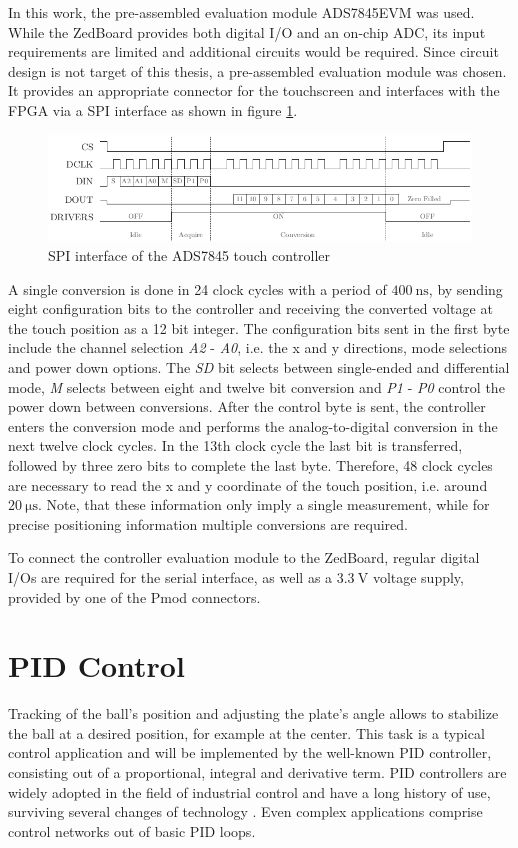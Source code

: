 In this work, the pre-assembled evaluation module ADS7845EVM \citep{ADS06} was
used. While the ZedBoard provides both digital I/O and an on-chip \ac{ADC},
its input requirements are limited and additional circuits would be required.
Since circuit design is not target of this thesis, a pre-assembled evaluation
module was chosen. It provides an appropriate connector for the touchscreen
and interfaces with the \ac{FPGA} via a \ac{SPI} interface as shown in figure
\ref{fig:touch_spi}.
\begin{figure}
	\centering
	\includegraphics{../figures/touch_spi}
	\caption{\acs{SPI} interface of the ADS7845 touch controller \citep[adapted from][]{ADST06}}
	\label{fig:touch_spi}
\end{figure}
A single conversion is done in 24 clock cycles with a period of
$\SI{400}{\nano\second}$, by sending eight configuration bits to the
controller and receiving the converted voltage at the touch position as a 12
bit integer. The configuration bits sent in the first byte include the channel
selection \emph{A2} - \emph{A0}, i.e. the x and y directions, mode selections
and power down options. The \emph{SD} bit selects between single-ended and
differential mode, \emph{M} selects between eight and twelve bit conversion
and \emph{P1} - \emph{P0} control the power down between conversions. After
the control byte is sent, the controller enters the conversion mode and
performs the analog-to-digital conversion in the next twelve clock cycles. In
the 13th clock cycle the last bit is transferred, followed by three zero bits
to complete the last byte. Therefore, 48 clock cycles are necessary to read
the x and y coordinate of the touch position, i.e. around
$\SI{20}{\micro\second}$. Note, that these information only imply a single
measurement, while for precise positioning information multiple conversions
are required.

To connect the controller evaluation module to the ZedBoard, regular digital
I/Os are required for the serial interface, as well as a $\SI{3.3}{\volt}$
voltage supply, provided by one of the \ac{Pmod} connectors.

\section{\acs{PID} Control}
Tracking of the ball's position and adjusting the plate's angle allows to
stabilize the ball at a desired position, for example at the center. This task
is a typical control application and will be implemented by the well-known
\ac{PID} controller, consisting out of a proportional, integral and derivative
term. \ac{PID} controllers are widely adopted in the field of industrial
control and have a long history of use, surviving several changes of
technology \citep{Joh05}. Even complex applications comprise control networks
out of basic \ac{PID} loops.

